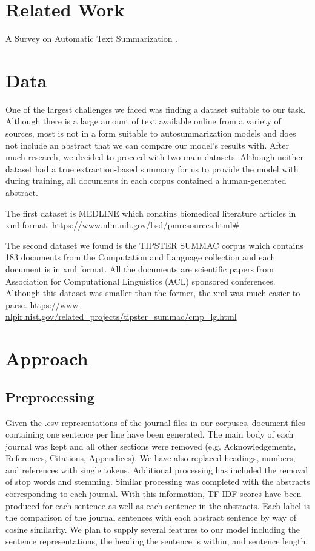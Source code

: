\documentclass[11pt]{article}
\begin{document}
\section{Related Work}
	A Survey on Automatic Text Summarization \cite{das2017}.

\section{Data} %
	One of the largest challenges we faced was finding a dataset suitable to our task. Although there is a large amount of text available online from a variety of sources, most is not in a form suitable to autosummarization models and does not include an abstract that we can compare our model's results with. After much research, we decided to proceed with two main datasets. Although neither dataset had a true extraction-based summary for us to provide the model with during training, all documents in each corpus contained a human-generated abstract.

The first dataset is MEDLINE which conatins biomedical literature articles in xml format. \url{https://www.nlm.nih.gov/bsd/pmresources.html#}

The second dataset we found is the TIPSTER SUMMAC corpus which contains 183 documents from the Computation and Language collection and each document is in xml format. All the documents are scientific papers from Association for Computational Linguistics (ACL) sponsored conferences. Although this dataset was smaller than the former, the xml was much easier to parse. \url{https://www-nlpir.nist.gov/related_projects/tipster_summac/cmp_lg.html}
 

\section{Approach}
	\subsection{Preprocessing} %
		Given the .csv representations of the journal files in our corpuses, document files containing one sentence per line have been generated. The main body of each journal was kept and all other sections were removed (e.g. Acknowledgements, References, Citations, Appendices). We have also replaced headings, numbers, and references with single tokens. Additional processing has included the removal of stop words and stemming. Similar processing was completed with the abstracts corresponding to each journal. With this information, TF-IDF scores have been produced for each sentence as well as each sentence in the abstracts. Each label is the comparison of the journal sentences with each abstract sentence by way of cosine similarity. We plan to supply several features to our model including the sentence representations, the heading the sentence is within, and sentence length.
\end{document}
